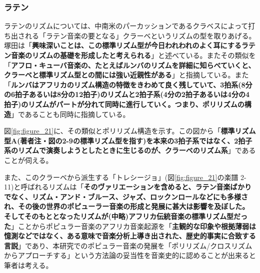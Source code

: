 \documentclass[uplatex,dvipdfmx]{ujarticle}
\begin{document}


\subsubsection{ラテン}

ラテンのリズムについては、中南米のパーカッションであるクラベスによって打ち出される「ラテン音楽の要となる」\cite{yubi:01}クラーベというリズムの型を取りあげる。塚田は「{\bf 興味深いことは、この標準リズム型が今日われわれのよく耳にするラテン音楽のリズムの基礎を形成したと考えられる}」\cite{tsukada:01}と述べている。またその類似を「{\bf アフロ・キューバ音楽の、たとえばルンバのリズムを詳細に知らべていくと、クラーベと標準リズム型との間には強い近親性がある}」\cite{tsukada:01}と指摘している。また「{\bf ルンバはアフリカのリズム構造の特徴をきわめて良く残していて、3拍系(8分の6拍子あるいは8分の12拍子)のリズムと2拍子系(4分の2拍子あるいは4分の4拍子)のリズムがパートが分れて同時に進行していく。つまり、ポリリズムの構造}」\cite{tsukada:01}であることも同時に指摘している。

図\ref{fig:figure_21}に、その類似とポリリズム構造を示す。この図から「{\bf 標準リズム型A(著者注・図の2-9の標準リズム型を指す)を本来の3拍子系ではなく、2拍子系のリズムで演奏しようとしたときに生じるのが、クラーベのリズム系}」\cite{tsukada:01}であることが伺える。

また、このクラーベから派生する「トレシージョ」(図\ref{fig:figure_21}の楽譜 2-11)と呼ばれるリズムは「{\bf そのヴァリエーションを含めると、ラテン音楽ばかりでなく、リズム・アンド・ブルース、ジャズ、ロックンロールなどにも多様され、その後の世界のポピューラー音楽の形成と発展に甚大は影響を及ぼした。そしてそのもととなったリズムが(中略)アフリカ伝統音楽の標準リズム型だった}」\cite{tsukada:01}ことからポピュラー音楽のアフリカ音楽起源を「{\bf 主観的な印象や根拠薄弱は憶測などではなく、ある意味で音楽分析上導き出された、歴史的事実に合致する言説}」\cite{tsukada:01}であり、本研究でのポピュラー音楽の発展を「ポリリズム/クロスリズムからアプローチする」という方法論の妥当性を音楽史的に認めることが出来ると筆者は考える。
\end{document}
